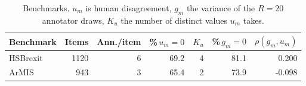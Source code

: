 \begin{table}[t]
\centering
\small
\begin{tabular}{lrrrrrr}
\hline
Benchmark & Items & Ann./item & \%\,$u_m{=}0$ & $K_u$ & \%\,$g_m{=}0$ & $\rho(g_m,u_m)$ \\
\hline
HSBrexit & 1120 & 6 & 69.2 & 4 & 81.1 & 0.200 \\
ArMIS & 943 & 3 & 65.4 & 2 & 73.9 & -0.098 \\
\hline
\end{tabular}
\caption{Benchmarks. $u_m$ is human disagreement, $g_m$ the variance of the $R=20$ annotator draws, $K_u$ the number of distinct values $u_m$ takes.}
\label{tab:data}
\end{table}